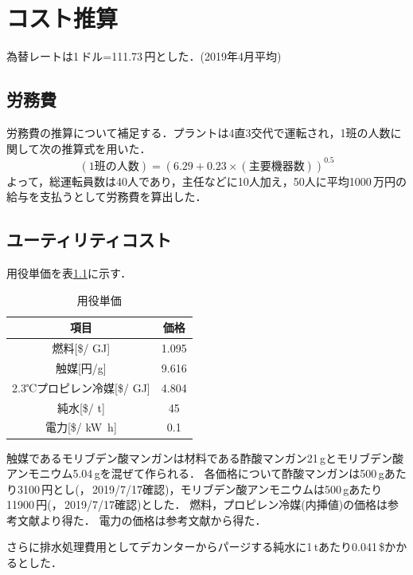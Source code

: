 \documentclass[a4j]{jsreport}
\begin{document}
\appendix
\chapter{コスト推算}
為替レートは1\,ドル=111.73\,円とした．(2019年4月平均)

\section{労務費}
労務費の推算について補足する．プラントは4直3交代で運転され，1班の人数に関して次の推算式を用いた．
\begin{equation}
    (1班の人数) = (6.29 + 0.23 \times (主要機器数))^{0.5}
\end{equation}
よって，総運転員数は40人であり，主任などに10人加え，50人に平均1000\,万円の給与を支払うとして労務費を算出した．

\section{ユーティリティコスト}
用役単価を表\ref{用役単価}に示す．
\begin{table}[htbp]
  \centering
  \caption{用役単価}
  \label{用役単価}
  \begin{tabular}{cc}
    \hline
    項目 & 価格 \\
    \hline
    燃料[\$/ \si{\giga \joule}] & 1.095 \\
    触媒[円/g] & 9.616 \\
    2.3℃プロピレン冷媒[\$/ \si{\giga \joule}] & 4.804 \\
    純水[\$/ \si{\tonne}] & 45 \\
    電力[\$/ \si{\kilo \watt \hour}] & 0.1 \\
    \hline
  \end{tabular}
\end{table}
触媒であるモリブデン酸マンガンは材料である酢酸マンガン21\,gとモリブデン酸アンモニウム5.04\,gを混ぜて作られる\cite{Li2019}．
各価格について酢酸マンガンは500\,gあたり3100\,円とし(\cite{酢酸マンガン}，\,2019/7/17確認)，モリブデン酸アンモニウムは500\,gあたり11900\,円(\cite{モリブデン酸アンモニウム}，\,2019/7/17確認)とした．
燃料，プロピレン冷媒(内挿値)の価格は参考文献\cite{プロセスデザインコンテスト10}より得た．
電力の価格は参考文献\cite{講義資料3}から得た．

さらに排水処理費用としてデカンターからパージする純水に1\,\si{\tonne}あたり0.041\,\$かかるとした\cite{講義資料3}．
\end{document}
